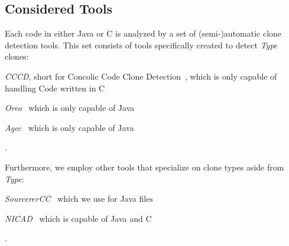 \documentclass[10pt,journal,compsoc]{IEEEtran}
\def\T#1{\textsl{Type\nobreakdash-#1}}
\def\todo#1{\textcolor{brown!80!yellow!70!black!90!red}{[\textsc{todo}: \textsf{#1}]}}
\begin{document}

\subsection{Considered Tools}
\label{lbl:cons-tools}
Each code in either Java or C is analyzed by a set of (semi-)automatic clone detection tools.
This set consists of tools specifically created to detect \T4 clones: \begin{inlist}
  \item \textsl{CCCD}, short for Concolic Code Clone Detection~\cite{6671332}, which is only capable of handling Code written in C
  \item \textsl{Oreo}~\cite{saini2018oreo} which is only capable of Java%
  \item \textsl{Agec}~\cite{6613854} which is only capable of Java%
\end{inlist}.

Furthermore, we employ other tools that specialize on clone types aside from \T4: \begin{inlist}
  \item \textsl{SourcererCC}~\cite{SourcererCC} which we use for Java files
  \item \textsl{NICAD}~\cite{cordy2011nicad} which is capable of Java and C%
\end{inlist}.
\end{document}
